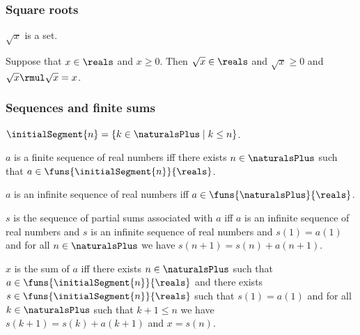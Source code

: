 \subsubsection{Square roots}

\begin{signature} \label{sig9}
    $\sqrt{x}$ is a set.
\end{signature}

\begin{axiom} \label{positive_square_root}
    Suppose that $x \in\reals$ and $x \geq 0$.
    Then $\sqrt{x} \in \reals$ and $\sqrt{x} \geq 0$ and $\sqrt{x} \rmul \sqrt{x} = x$.
\end{axiom}    


\subsubsection{Sequences and finite sums}

\begin{definition}\label{initial_segment_naturalsplus}
    $\initialSegment{n} = \{k\in\naturalsPlus \mid k \leq n\}$.
\end{definition}

\begin{definition}\label{finite_real_sequence}
    $a$ is a finite sequence of real numbers iff
    there exists $n\in\naturalsPlus$ such that
    $a\in\funs{\initialSegment{n}}{\reals}$.
\end{definition}

\begin{definition}\label{infinite_real_sequence}
    $a$ is an infinite sequence of real numbers iff
    $a\in\funs{\naturalsPlus}{\reals}$.
\end{definition}

\begin{definition}\label{partial_sums_sequence}
    $s$ is the sequence of partial sums associated with $a$ iff
    $a$ is an infinite sequence of real numbers and
    $s$ is an infinite sequence of real numbers and
    $s(1) = a(1)$ and
    for all $n\in\naturalsPlus$ we have
    $s(n + 1) = s(n) + a(n + 1)$.
\end{definition}

\begin{definition}\label{sum_of_finite_sequence}
    $x$ is the sum of $a$ iff
    there exists $n\in\naturalsPlus$ such that
    $a\in\funs{\initialSegment{n}}{\reals}$ and
    there exists $s\in\funs{\initialSegment{n}}{\reals}$ such that
    $s(1) = a(1)$ and
    for all $k\in\naturalsPlus$ such that $k + 1 \leq n$ we have
    $s(k + 1) = s(k) + a(k + 1)$ and
    $x = s(n)$.
\end{definition}

